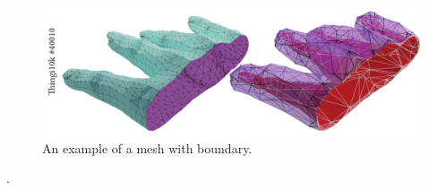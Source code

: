 \begin{figure}
    \centering
    \includegraphics[width=0.9\linewidth]{prism-tex/figs/open-hand}
    \caption{An example of a mesh with boundary.}
    \label{prism:fig:open-hand}
    
\end{figure}




.